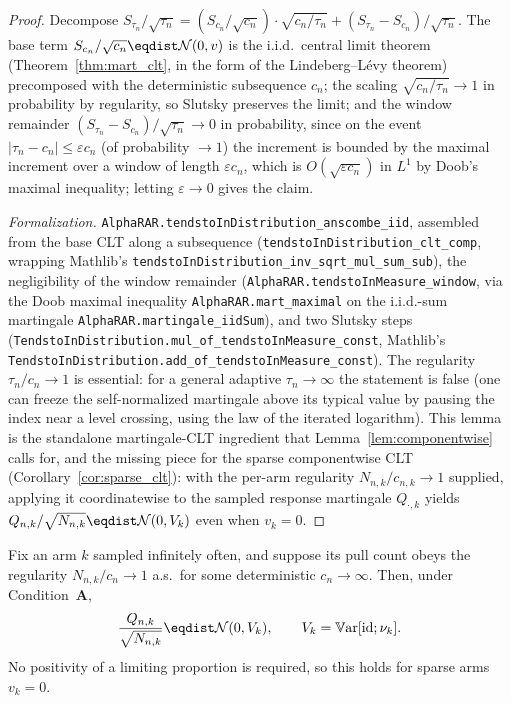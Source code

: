 \begin{proof}\leanok
{}
Decompose
$S_{\tau_n}/\sqrt{\tau_n}=(S_{c_n}/\sqrt{c_n})\cdot\sqrt{c_n/\tau_n}+(S_{\tau_n}-S_{c_n})/\sqrt{\tau_n}$.
The base term $S_{c_n}/\sqrt{c_n}\eqdist\mathcal N(0,v)$ is the i.i.d.\ central limit theorem
(Theorem~\ref{thm:mart_clt}, in the form of the Lindeberg--L\'evy theorem) precomposed with the
deterministic subsequence $c_n$; the scaling $\sqrt{c_n/\tau_n}\to1$ in probability by regularity, so
Slutsky preserves the limit; and the window remainder $(S_{\tau_n}-S_{c_n})/\sqrt{\tau_n}\to0$ in
probability, since on the event $|\tau_n-c_n|\le\varepsilon c_n$ (of probability $\to1$) the increment
is bounded by the maximal increment over a window of length $\varepsilon c_n$, which is
$O(\sqrt{\varepsilon c_n})$ in $L^1$ by Doob's maximal inequality; letting $\varepsilon\to0$ gives the
claim.

\emph{Formalization.} \texttt{AlphaRAR.tendstoInDistribution\_anscombe\_iid}, assembled from the
base CLT along a subsequence (\texttt{tendstoInDistribution\_clt\_comp}, wrapping Mathlib's
\texttt{tendstoInDistribution\_inv\_sqrt\_mul\_sum\_sub}), the negligibility of the window remainder
(\texttt{AlphaRAR.tendstoInMeasure\_window}, via the Doob maximal inequality
\texttt{AlphaRAR.mart\_maximal} on the i.i.d.-sum martingale \texttt{AlphaRAR.martingale\_iidSum}),
and two Slutsky steps (\texttt{TendstoInDistribution.mul\_of\_tendstoInMeasure\_const},
Mathlib's \texttt{TendstoInDistribution.add\_of\_tendstoInMeasure\_const}). The regularity
$\tau_n/c_n\to1$ is
essential: for a general adaptive $\tau_n\to\infty$ the statement is false (one can freeze the
self-normalized martingale above its typical value by pausing the index near a level crossing, using
the law of the iterated logarithm). This lemma is the standalone martingale-CLT ingredient that
Lemma~\ref{lem:componentwise} calls for, and the missing piece for the sparse componentwise CLT
(Corollary~\ref{cor:sparse_clt}): with the per-arm regularity $N_{n,k}/c_{n,k}\to1$ supplied, applying
it coordinatewise to the sampled response martingale $Q_{\cdot,k}$ yields
$Q_{n,k}/\sqrt{N_{n,k}}\eqdist\mathcal N(0,V_k)$ even when $v_k=0$.
\end{proof}

\begin{lemma}\label{lem:mart_clt_selfnorm_arm_sparse}
\leanok
{}
Fix an arm $k$ sampled infinitely often, and suppose its pull count obeys the regularity
$N_{n,k}/c_n\to1$ a.s.\ for some deterministic $c_n\to\infty$. Then, under Condition~\textbf{A},
\[
  \frac{Q_{n,k}}{\sqrt{N_{n,k}}} \eqdist \mathcal N(0, V_k),\qquad V_k=\mathbb{V}\mathrm{ar}[\mathrm{id};\nu_k].
\]
No positivity of a limiting proportion is required, so this holds for sparse arms $v_k=0$.
\end{lemma}


